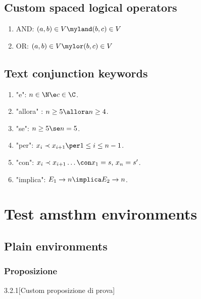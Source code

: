 \subsection{Custom spaced logical operators}

\begin{enumerate}
\item AND: $(a,b) \in V \myland (b,c) \in V$
\item OR: $(a,b) \in V \mylor (b,c) \in V$
\end{enumerate}

\subsection{Text conjunction keywords}

\begin{enumerate}
\item "e": $n \in \N \e c \in \C$.
\item "allora" : $n \geq 5 \allora n \geq 4$.
\item "se": $n \geq 5 \se n = 5$.
\item "per": $x_i \prec x_{i+1} \per 1 \leq i \leq n-1$.
\item "con": $x_i \prec x_{i+1} \ldots \con x_1 = s \text{,} \ x_n = s'$.
\item "implica":  $E_1 \rightarrow n \implica E_2 \rightarrow n$.
\end{enumerate}

\section{Test amsthm environments}

\subsection{Plain environments}

\subsubsection{Proposizione}

\begin{proposizione}
\lipsum[4]
\end{proposizione}

\begin{proposizione-num}{3.2.1}[Custom proposizione di prova]
\lipsum[4]
\end{proposizione-num}


